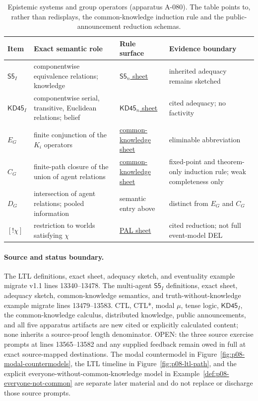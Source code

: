 \begin{table}[!htbp]
\centering
\scriptsize
\begin{tabular}{@{}p{}p{}p{}p{}@{}}
\toprule
Item & Exact semantic role & Rule surface & Evidence boundary \\
\midrule
\(\mathsf{S5}_{I}\) & componentwise equivalence relations; knowledge &
\hyperref[sheet:hilbert-s5n]{\(\mathsf{S5}_n\) sheet} & inherited adequacy remains sketched \\
\(\mathsf{KD45}_{I}\) & componentwise serial, transitive, Euclidean relations;
belief & \hyperref[sheet:hilbert-kd45n]{\(\mathsf{KD45}_n\) sheet} & cited adequacy; no factivity \\
\(E_G\) & finite conjunction of the \(K_i\) operators &
\hyperref[sheet:hilbert-common-knowledge]{common-knowledge sheet} & eliminable abbreviation \\
\(C_G\) & finite-path closure of the union of agent relations &
\hyperref[sheet:hilbert-common-knowledge]{common-knowledge sheet} & fixed-point and theorem-only induction rule;
weak completeness only \\
\(D_G\) & intersection of agent relations; pooled information &
semantic entry above & distinct from \(E_G\) and \(C_G\) \\
\([!\chi]\) & restriction to worlds satisfying \(\chi\) &
\hyperref[sheet:hilbert-pal]{PAL sheet} & cited reduction; not full event-model DEL \\
\bottomrule
\end{tabular}
\caption{Epistemic systems and group operators (apparatus A-080).  The table
points to, rather than redisplays, the common-knowledge induction rule and the
public-announcement reduction schemas.}
\label{tab:p08-epistemic-systems}
\end{table}


\paragraph{Source and status boundary.}
The LTL definitions, exact sheet, adequacy sketch, and eventuality example
migrate v1.1 lines 13340--13478.  The multi-agent \(\mathsf{S5}_{I}\)
definitions, exact sheet, adequacy sketch, common-knowledge semantics, and
truth-without-knowledge example migrate lines 13479--13583.  CTL, CTL*, modal
\(\mu\), tense logic, \(\mathsf{KD45}_{I}\), the common-knowledge calculus,
distributed knowledge, public announcements, and all five apparatus artifacts
are new cited or explicitly calculated content; none inherits a source-proof
length denominator.  OPEN: the three source exercise prompts at lines
13565--13582 and any supplied feedback remain owed in full at exact
source-mapped destinations.  The modal countermodel in
Figure~\ref{fig:p08-modal-countermodels}, the LTL timeline in
Figure~\ref{fig:p08-ltl-path}, and the explicit
everyone-without-common-knowledge model in
Example~\ref{def:p08-everyone-not-common} are separate later material and do
not replace or discharge those source prompts.
